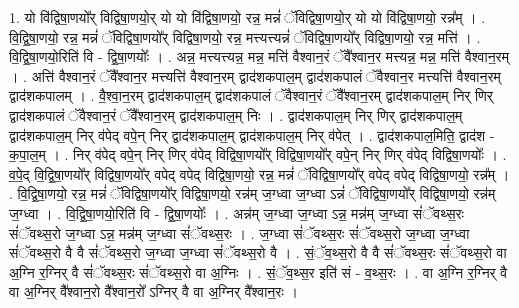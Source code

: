 \documentclass[17pt]{extarticle}
\begin{document}
1. यो वि॑द्विषा॒णयो᳚र् विद्विषा॒णयो॒र् यो यो वि॑द्विषा॒णयो॒ रन्न॒ मन्नं॑ ॅविद्विषा॒णयो॒र् यो यो वि॑द्विषा॒णयो॒ रन्न᳚म् । . वि॒द्वि॒षा॒णयो॒ रन्न॒ मन्नं॑ ॅविद्विषा॒णयो᳚र् विद्विषा॒णयो॒ रन्न॒ मत्त्यत्त्यन्नं॑ ॅविद्विषा॒णयो᳚र् विद्विषा॒णयो॒ रन्न॒ मत्ति॑ । . वि॒द्वि॒षा॒णयो॒रिति॑ वि - द्वि॒षा॒णयोः᳚ । . अन्न॒ मत्त्यत्त्यन्न॒ मन्न॒ मत्ति॑ वैश्वान॒रं ॅवै᳚श्वान॒र मत्त्यन्न॒ मन्न॒ मत्ति॑ वैश्वान॒रम् । . अत्ति॑ वैश्वान॒रं ॅवै᳚श्वान॒र मत्त्यत्ति॑ वैश्वान॒रम् द्वाद॑शकपाल॒म् द्वाद॑शकपालं ॅवैश्वान॒र मत्त्यत्ति॑ वैश्वान॒रम् द्वाद॑शकपालम् । . वै॒श्वा॒न॒रम् द्वाद॑शकपाल॒म् द्वाद॑शकपालं ॅवैश्वान॒रं ॅवै᳚श्वान॒रम् द्वाद॑शकपाल॒म् निर् णिर् द्वाद॑शकपालं ॅवैश्वान॒रं ॅवै᳚श्वान॒रम् द्वाद॑शकपाल॒म् निः । . द्वाद॑शकपाल॒म् निर् णिर् द्वाद॑शकपाल॒म् द्वाद॑शकपाल॒म् निर् व॑पेद् वपे॒न् निर् द्वाद॑शकपाल॒म् द्वाद॑शकपाल॒म् निर् व॑पेत् । . द्वाद॑शकपाल॒मिति॒ द्वाद॑श - क॒पा॒ल॒म् । . निर् व॑पेद् वपे॒न् निर् णिर् व॑पेद् विद्विषा॒णयो᳚र् विद्विषा॒णयो᳚र् वपे॒न् निर् णिर् व॑पेद् विद्विषा॒णयोः᳚ । . व॒पे॒द् वि॒द्वि॒षा॒णयो᳚र् विद्विषा॒णयो᳚र् वपेद् वपेद् विद्विषा॒णयो॒ रन्न॒ मन्नं॑ ॅविद्विषा॒णयो᳚र् वपेद् वपेद् विद्विषा॒णयो॒ रन्न᳚म् । . वि॒द्वि॒षा॒णयो॒ रन्न॒ मन्नं॑ ॅविद्विषा॒णयो᳚र् विद्विषा॒णयो॒ रन्न॑म् ज॒ग्ध्वा ज॒ग्ध्वा ऽन्नं॑ ॅविद्विषा॒णयो᳚र् विद्विषा॒णयो॒ रन्न॑म् ज॒ग्ध्वा । . वि॒द्वि॒षा॒णयो॒रिति॑ वि - द्वि॒षा॒णयोः᳚ । . अन्न॑म् ज॒ग्ध्वा ज॒ग्ध्वा ऽन्न॒ मन्न॑म् ज॒ग्ध्वा सं॑ॅवथ्स॒रः सं॑ॅवथ्स॒रो ज॒ग्ध्वा ऽन्न॒ मन्न॑म् ज॒ग्ध्वा सं॑ॅवथ्स॒रः । . ज॒ग्ध्वा सं॑ॅवथ्स॒रः सं॑ॅवथ्स॒रो ज॒ग्ध्वा ज॒ग्ध्वा सं॑ॅवथ्स॒रो वै वै सं॑ॅवथ्स॒रो ज॒ग्ध्वा ज॒ग्ध्वा सं॑ॅवथ्स॒रो वै । . सं॒ॅव॒थ्स॒रो वै वै सं॑ॅवथ्स॒रः सं॑ॅवथ्स॒रो वा अ॒ग्नि र॒ग्निर् वै सं॑ॅवथ्स॒रः सं॑ॅवथ्स॒रो वा अ॒ग्निः । . सं॒ॅव॒थ्स॒र इति॑ सं - व॒थ्स॒रः । . वा अ॒ग्नि र॒ग्निर् वै वा अ॒ग्निर् वै᳚श्वान॒रो वै᳚श्वान॒रो᳚ ऽग्निर् वै वा अ॒ग्निर् वै᳚श्वान॒रः । \newline
\end{document}
